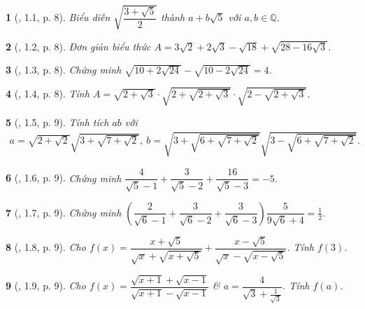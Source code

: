 \documentclass{article}
\newtheorem{baitoan}{}%
\begin{document}
\begin{baitoan}[\cite{TLCT_THCS_Toan_9_dai_so}, 1.1, p. 8]
	Biểu diễn $\sqrt{\dfrac{3 + \sqrt{5}}{2}}$ thành $a + b\sqrt{5}$ với $a,b\in\mathbb{Q}$.
\end{baitoan}

\begin{baitoan}[\cite{TLCT_THCS_Toan_9_dai_so}, 1.2, p. 8]
	Đơn giản biểu thức $A = 3\sqrt{2} + 2\sqrt{3} - \sqrt{18} + \sqrt{28 - 16\sqrt{3}}$.
\end{baitoan}

\begin{baitoan}[\cite{TLCT_THCS_Toan_9_dai_so}, 1.3, p. 8]
	Chứng minh $\sqrt{10 + 2\sqrt{24}} - \sqrt{10 - 2\sqrt{24}} = 4$.
\end{baitoan}

\begin{baitoan}[\cite{TLCT_THCS_Toan_9_dai_so}, 1.4, p. 8]
	Tính $A = \sqrt{2 + \sqrt{3}}\cdot\sqrt{2 + \sqrt{2 + \sqrt{3}}}\cdot\sqrt{2 - \sqrt{2 + \sqrt{3}}}$.
\end{baitoan}

\begin{baitoan}[\cite{TLCT_THCS_Toan_9_dai_so}, 1.5, p. 9]
	Tính tích $ab$ với
	\begin{align*}
		a = \sqrt{2 + \sqrt{2}}\sqrt{3 + \sqrt{7 + \sqrt{2}}},\ b = \sqrt{3 + \sqrt{6 + \sqrt{7 + \sqrt{2}}}}\sqrt{3 - \sqrt{6 + \sqrt{7 + \sqrt{2}}}}.
	\end{align*}
\end{baitoan}

\begin{baitoan}[\cite{TLCT_THCS_Toan_9_dai_so}, 1.6, p. 9]
	Chứng minh $\dfrac{4}{\sqrt{5} - 1} + \dfrac{3}{\sqrt{5} - 2} + \dfrac{16}{\sqrt{5} - 3} = -5$.
\end{baitoan}

\begin{baitoan}[\cite{TLCT_THCS_Toan_9_dai_so}, 1.7, p. 9]
	Chứng minh $\left(\dfrac{2}{\sqrt{6} - 1} + \dfrac{3}{\sqrt{6} - 2} + \dfrac{3}{\sqrt{6} - 3}\right)\dfrac{5}{9\sqrt{6} + 4} = \frac{1}{2}$.
\end{baitoan}

\begin{baitoan}[\cite{TLCT_THCS_Toan_9_dai_so}, 1.8, p. 9]
	Cho $f(x) = \dfrac{x + \sqrt{5}}{\sqrt{x} + \sqrt{x + \sqrt{5}}} + \dfrac{x - \sqrt{5}}{\sqrt{x} - \sqrt{x - \sqrt{5}}}$. Tính $f(3)$.
\end{baitoan}

\begin{baitoan}[\cite{TLCT_THCS_Toan_9_dai_so}, 1.9, p. 9]
	Cho $f(x) = \dfrac{\sqrt{x + 1} + \sqrt{x - 1}}{\sqrt{x + 1} - \sqrt{x - 1}}$ \& $a = \dfrac{4}{\sqrt{3} + \frac{1}{\sqrt{3}}}$. Tính $f(a)$.
\end{baitoan}
\end{document}
